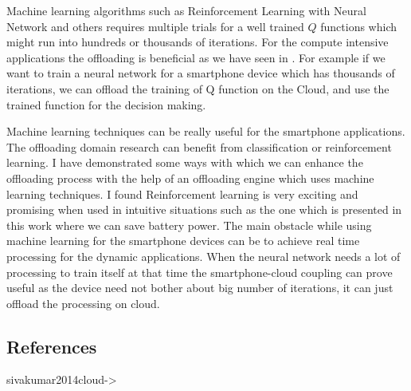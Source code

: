 \documentclass[12pt]{report}
\begin{document}
Machine learning algorithms such as Reinforcement Learning with Neural Network and others requires multiple trials for a well trained $Q$ functions which might run into hundreds or thousands of iterations.
For the compute intensive applications the offloading is beneficial as we have seen in \cite{kumar2010cloud}. For example if we
want to train a neural network for a smartphone device which has thousands of iterations, we
can offload the training of Q function on the Cloud, and use the trained function for the decision making.
\par
Machine learning techniques can be really useful for the smartphone applications. The offloading domain research can benefit from classification or reinforcement learning. I have demonstrated some ways with which we can enhance the offloading process with the help
of an offloading engine which uses machine learning techniques. I found Reinforcement learning is very exciting and promising when used in intuitive situations such as the one which is presented in this work where we can save battery power. 
The main obstacle while using machine learning for the smartphone devices can be to achieve real time processing for the dynamic applications. When the neural network needs a lot of processing to train itself at that time the smartphone-cloud coupling can prove useful as the device need not bother about big number of iterations, it can just offload the processing on cloud. 


\subsection{References}
sivakumar2014cloud-> \cite{sivakumar2014cloud}


\end{document}
